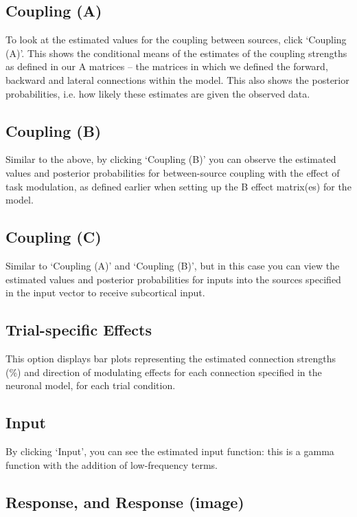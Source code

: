 \subsection{Coupling (A)}

To look at the estimated values for the coupling between sources, click
`Coupling (A)'. This shows the conditional means of the estimates of the
coupling strengths as defined in our A matrices -- the matrices in which
we defined the forward, backward and lateral connections within the
model. This also shows the posterior probabilities, i.e. how likely
these estimates are given the observed data.

\subsection{Coupling (B)}

Similar to the above, by clicking `Coupling (B)' you can observe the
estimated values and posterior probabilities for between-source coupling
with the effect of task modulation, as defined earlier when setting up
the B effect matrix(es) for the model.

\subsection{Coupling (C)}

Similar to `Coupling (A)' and `Coupling (B)', but in this case you can
view the estimated values and posterior probabilities for inputs into
the sources specified in the input vector to receive subcortical input.

\subsection{Trial-specific Effects}

This option displays bar plots representing the estimated connection
strengths (\%) and direction of modulating effects for each connection
specified in the neuronal model, for each trial condition.

\subsection{Input}

By clicking `Input', you can see the estimated input function: this is a
gamma function with the addition of low-frequency terms.

\subsection{Response, and Response (image)}

